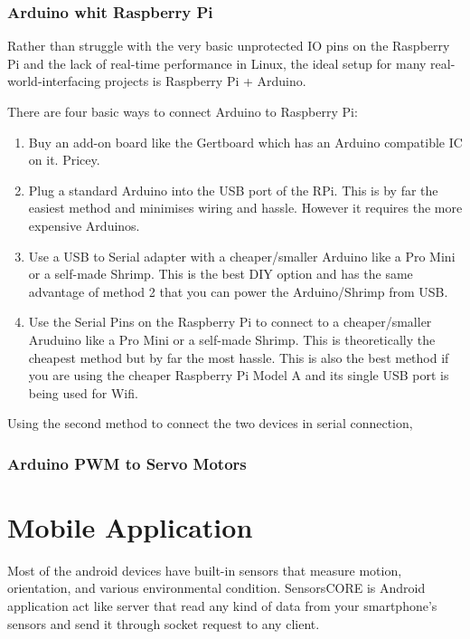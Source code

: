 		\subsubsection{Arduino whit Raspberry Pi} 
		
		Rather than struggle with the very basic unprotected IO pins on the Raspberry Pi and the lack of real-time performance in Linux, the ideal setup for many real-world-interfacing projects is Raspberry Pi + Arduino.
		
		There are four basic ways to connect Arduino to Raspberry Pi:
		\begin{enumerate}
			\item Buy an add-on board like the Gertboard which has an Arduino compatible IC on it. Pricey.
			\item Plug a standard Arduino into the USB port of the RPi. This is by far the easiest method and minimises wiring and hassle. However it requires the more expensive Arduinos.
			\item Use a USB to Serial adapter with a cheaper/smaller Arduino like a Pro Mini or a self-made Shrimp. This is the best DIY option and has the same advantage of method 2 that you can power the Arduino/Shrimp from USB.
			\item Use the Serial Pins on the Raspberry Pi to connect to a cheaper/smaller Aruduino like a Pro Mini or a self-made Shrimp. This is theoretically the cheapest method but by far the most hassle. This is also the best method if you are using the cheaper Raspberry Pi Model A and its single USB port is being used for Wifi.
		\end{enumerate}	
		Using the second method to connect the two devices in serial connection,
		
		
		\subsubsection{Arduino PWM to Servo Motors} 
		
		
\section{Mobile Application}

	Most of the android devices have built-in sensors that measure motion, orientation, and various environmental condition.
	SensorsCORE is Android application act like server that read any kind of data from your smartphone's sensors and send it through socket request to any client.  
	
